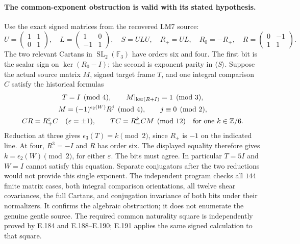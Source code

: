 \paragraph{The common-exponent obstruction is valid with its stated hypothesis.}
Use the exact signed matrices from the recovered LM7 source:
\[
 U=\begin{pmatrix}1&1\\0&1\end{pmatrix},\quad
 L=\begin{pmatrix}1&0\\-1&1\end{pmatrix},\quad
 S=ULU,\quad R_+=UL,\quad R_0=-R_+,
 \quad R=\begin{pmatrix}0&-1\\1&1\end{pmatrix}.
\]
The two relevant Cartans in $\operatorname{SL}_2(\mathbb F_3)$
have orders six and four.  The first bit is the scalar sign on
$\ker(R_0-I)$; the second is exponent parity in $\langle S\rangle$.
Suppose the actual source matrix $M$, signed target frame $T$,
and one integral comparison $C$ satisfy the historical formulas
\[
 \begin{gathered}
 T=I\pmod4,\qquad
 M|_{\ker(R+I)}=1\pmod3,\\
 M=(-1)^{\epsilon_2(W)}R^j\pmod4,\qquad j\equiv0\pmod2,\\
 CR=R_+^{\varepsilon}C\quad(\varepsilon=\pm1),\qquad
 TC=R_+^kCM\pmod {12}
 \quad\hbox{for one }k\in\mathbb Z/6.
 \end{gathered}
\]
Reduction at three gives $\epsilon_3(T)=k\pmod2$, since
$R_+$ is $-1$ on the indicated line.  At four, $R^3=-I$
and $R$ has order six.  The displayed equality therefore gives
$k=\epsilon_2(W)\pmod2$, for either $\varepsilon$.
The bits must agree.  In particular $T=5I$ and $W=I$ cannot
satisfy this equation.  Separate conjugators after the two
reductions would not provide this single exponent.
The independent program 
checks all $144$ finite matrix cases, both integral comparison
orientations, all twelve shear covariances, the full Cartans,
and conjugation invariance of both bits under their normalizers.
It confirms the algebraic obstruction; it does not enumerate
the genuine gentle source.  The required common naturality
square is independently proved by E.184 and E.188--E.190;
E.191 applies the same signed calculation to that square.

